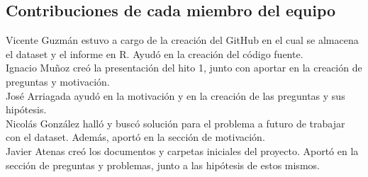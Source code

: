 \documentclass[
]{article}
\begin{document}
\hfill\break

\hypertarget{contribuciones-de-cada-miembro-del-equipo}{%
\subsection{Contribuciones de cada miembro del
equipo}\label{contribuciones-de-cada-miembro-del-equipo}}

Vicente Guzmán estuvo a cargo de la creación del GitHub en el cual se
almacena el dataset y el informe en R. Ayudó en la creación del código
fuente.\\
Ignacio Muñoz creó la presentación del hito 1, junto con aportar en la
creación de preguntas y motivación.\\
José Arriagada ayudó en la motivación y en la creación de las preguntas
y sus hipótesis.\\
Nicolás González halló y buscó solución para el problema a futuro de
trabajar con el dataset. Además, aportó en la sección de motivación.\\
Javier Atenas creó los documentos y carpetas iniciales del proyecto.
Aportó en la sección de preguntas y problemas, junto a las hipótesis de
estos mismos.
\end{document}
